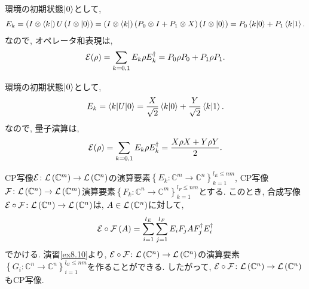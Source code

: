 \begin{ex}
    \label{ex8.4}
    環境の初期状態$\ket{0}$として,
    \begin{align*}
        E_k
        = \left(I \otimes \bra{k}\right)   U  \left(I \otimes \ket{0}\right)
        =
        \left(I \otimes \bra{k}\right)
        \left( P_0 \otimes I + P_1 \otimes X  \right)
        \left(I \otimes \ket{0}\right)
        = P_0 \braket{k|0} + P_1 \braket{k|1}.
    \end{align*}
    なので, オペレータ和表現は,
    \begin{align*}
        \mathcal{E} (\rho)
        = \sum_{k = 0, 1} E_k \rho E_k^\dagger
        = P_0 \rho P_0 + P_1 \rho P_1.
    \end{align*}
\end{ex}

\begin{ex}
    \label{ex8.5}
    環境の初期状態$\ket{0}$として,
    \begin{align*}
        E_k
        = \braket{k | U | 0}
        = \frac{X}{\sqrt{2}} \braket{k|0} + \frac{Y}{\sqrt{2}} \braket{k|1}.
    \end{align*}
    なので, 量子演算は,
    \begin{align*}
        \mathcal{E} (\rho)
        = \sum_{k = 0, 1} E_k \rho E_k^\dagger
        = \frac{X \rho X + Y \rho Y}{2}.
    \end{align*}
\end{ex}

\begin{ex}
    \label{ex8.6}
    \par
    CP写像$\mathcal{E} \colon \mathcal{L}\left({\mathbb{C}^m}\right) \to \mathcal{L}\left({\mathbb{C}^n}\right)$の演算要素$\left\{E_k \colon \mathbb{C}^m \to \mathbb{C}^n \right\}_{k=1}^{l_E \le nm}$, CP写像$\mathcal{F} \colon \mathcal{L}\left({\mathbb{C}^n}\right) \to \mathcal{L}\left({\mathbb{C}^m}\right)$演算要素$\left\{F_k \colon \mathbb{C}^n \to \mathbb{C}^m \right\}_{k=1}^{l_F \le nm}$とする. このとき, 合成写像$\mathcal{E} \circ \mathcal{F} \colon \mathcal{L}\left({\mathbb{C}^n}\right) \to \mathcal{L}\left({\mathbb{C}^n}\right)$は, $A \in \mathcal{L}\left({\mathbb{C}^n}\right)$に対して,
    \begin{align*}
        \mathcal{E} \circ \mathcal{F} \left( A\right)
        =
        \sum_{i = 1}^{l_E}\sum_{j=1}^{l_F}
        E_i F_j A F_j^\dagger E_i^\dagger
    \end{align*}
    でかける. 演習\ref{ex8.10}より, $\mathcal{E} \circ \mathcal{F} \colon \mathcal{L}\left({\mathbb{C}^n}\right) \to \mathcal{L}\left({\mathbb{C}^n}\right)$の演算要素$\left\{G_i \colon \mathbb{C}^n \to \mathbb{C}^n \right\}_{i=1}^{l_G \le nm}$を作ることができる. したがって, $\mathcal{E} \circ \mathcal{F} \colon \mathcal{L}\left({\mathbb{C}^n}\right) \to \mathcal{L}\left({\mathbb{C}^n}\right)$もCP写像.
\end{ex}

